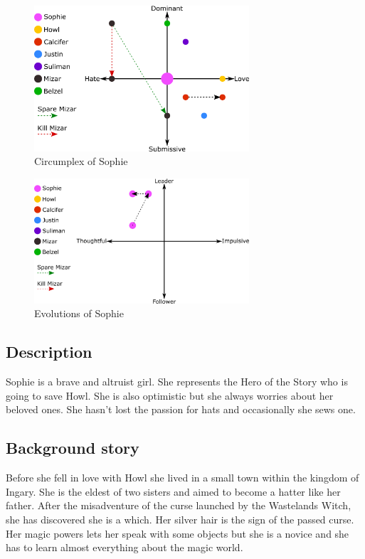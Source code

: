 \begin{figure}[H]
  \centering
  \includegraphics[width=8cm]{Images/SVG/Exported/Circumplexes/sophieCircumplex}
  \caption{Circumplex of Sophie}
\end{figure}

\begin{figure}[H]
  \centering
  \includegraphics[width=8cm]{Images/SVG/Exported/Evolutions/sophieEvolution}
  \caption{Evolutions of Sophie}
\end{figure}

\subsection{Description}
Sophie is a brave and altruist girl. She represents the Hero of the Story who is going to save Howl. She is also optimistic but she always worries about her beloved ones. She hasn’t lost the passion for hats and occasionally she sews one.

\subsection{Background story}
Before she fell in love with Howl she lived in a small town within the kingdom of Ingary. She is the eldest of two sisters and aimed to become a hatter like her father. After the misadventure of the curse launched by the Wastelands Witch, she has discovered she is a which. Her silver hair is the sign of the passed curse. Her magic powers lets her speak with some objects but she is a novice and she has to learn almost everything about the magic world.
